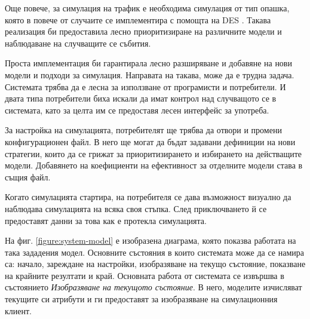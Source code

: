 	Още повече, за симулация на трафик е необходима симулация от тип опашка, която в повече от случаите
	се имплементира с помощта на \ac{DES} \cite{Barlas}. Такава реализация би предоставила лесно
	приоритизиране на различните модели и наблюдаване на случващите се събития.
	
	Проста имплементация би гарантирала лесно разширяване и добавяне на нови модели и подходи за симулация.
	Направата на такава, може да е трудна задача. Системата трябва да е лесна за използване от програмисти
	и потребители. И двата типа потребители биха искали да имат контрол над случващото се в системата,
	като за целта им се предоставя лесен интерфейс за употреба.
	
	За настройка на симулацията, потребителят ще трябва да отвори и промени конфигурационен файл. 
	В него ще могат да бъдат задавани дефиниции на нови стратегии, които да се грижат за приоритизирането
	и избирането на действащите модели. Добавянето на коефициенти на ефективност за отделните модели става
	в същия файл.
	
	Когато симулацията стартира, на потребителя се дава възможност визуално
	да наблюдава симулацията на всяка своя стъпка. След приключването й се предоставят
	данни за това как е протекла симулацията. 
	
	На фиг. \ref{figure:system-model} е изобразена диаграма, която показва
	работата на така зададения модел.	Основните състояния в които системата може да се намира са:
	начало, зареждане на настройки, изобразяване на текущо състояние, показване на крайните резултати и край.
	Основната работа от системата се извършва в състоянието \emph{Изобразяване на текущото състояние}.
	В него, моделите изчисляват текущите си атрибути и ги предоставят за изобразяване на симулационния клиент.
	
